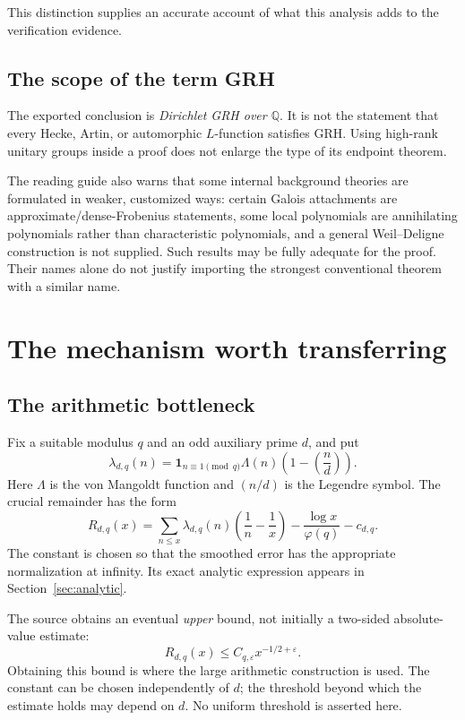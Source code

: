\documentclass[11pt,letterpaper]{article}
\theoremstyle{definition}
\theoremstyle{remark}
\newcommand{\Q}{\mathbb Q}
\newcommand{\eps}{\varepsilon}
\newcommand{\ind}{\mathbf 1}
\begin{document}
This distinction supplies an accurate account of what this analysis adds
to the verification evidence.

\subsection{The scope of the term GRH}

The exported conclusion is \emph{Dirichlet GRH over \(\Q\)}. It is not the
statement that every Hecke, Artin, or automorphic \(L\)-function satisfies
GRH. Using high-rank unitary groups inside a proof does not enlarge the type
of its endpoint theorem.

The reading guide also warns that some internal background theories are
formulated in weaker, customized ways: certain Galois attachments are
approximate/dense-Frobenius statements, some local polynomials are
annihilating polynomials rather than characteristic polynomials, and a
general Weil--Deligne construction is not supplied. Such results may be
fully adequate for the proof. Their names alone do not justify importing
the strongest conventional theorem with a similar name.

\section{The mechanism worth transferring}
\label{sec:mechanism}

\subsection{The arithmetic bottleneck}

Fix a suitable modulus \(q\) and an odd auxiliary prime \(d\), and put
\[
 \lambda_{d,q}(n)=
 \ind_{n\equiv1\pmod q}\Lambda(n)\left(1-\left(\frac nd\right)\right).
\]
Here \(\Lambda\) is the von Mangoldt function and \((n/d)\) is the Legendre
symbol. The crucial remainder has the form
\begin{equation}\label{eq:remainder}
 R_{d,q}(x)=
 \sum_{n\le x}\lambda_{d,q}(n)\left(\frac1n-\frac1x\right)
 -\frac{\log x}{\varphi(q)}-c_{d,q}.
\end{equation}
The constant is chosen so that the smoothed error has the appropriate
normalization at infinity. Its exact analytic expression appears in
Section~\ref{sec:analytic}.

The source obtains an eventual \emph{upper} bound, not initially a
two-sided absolute-value estimate:
\[
 R_{d,q}(x)\le C_{q,\eps}x^{-1/2+\eps}.
\]
Obtaining this bound is where the large arithmetic construction is used.
The constant can be chosen independently of \(d\); the threshold beyond
which the estimate holds may depend on \(d\). No uniform threshold is
asserted here.
\end{document}

